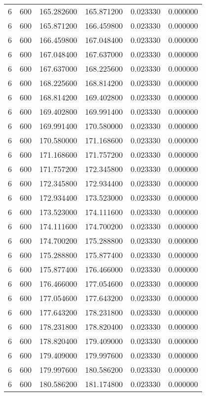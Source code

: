 \begin{longtable}{rrrrrr}
6 & 600 & 165.282600 & 165.871200 & 0.023330 & 0.000000 \\
6 & 600 & 165.871200 & 166.459800 & 0.023330 & 0.000000 \\
6 & 600 & 166.459800 & 167.048400 & 0.023330 & 0.000000 \\
6 & 600 & 167.048400 & 167.637000 & 0.023330 & 0.000000 \\
6 & 600 & 167.637000 & 168.225600 & 0.023330 & 0.000000 \\
6 & 600 & 168.225600 & 168.814200 & 0.023330 & 0.000000 \\
6 & 600 & 168.814200 & 169.402800 & 0.023330 & 0.000000 \\
6 & 600 & 169.402800 & 169.991400 & 0.023330 & 0.000000 \\
6 & 600 & 169.991400 & 170.580000 & 0.023330 & 0.000000 \\
6 & 600 & 170.580000 & 171.168600 & 0.023330 & 0.000000 \\
6 & 600 & 171.168600 & 171.757200 & 0.023330 & 0.000000 \\
6 & 600 & 171.757200 & 172.345800 & 0.023330 & 0.000000 \\
6 & 600 & 172.345800 & 172.934400 & 0.023330 & 0.000000 \\
6 & 600 & 172.934400 & 173.523000 & 0.023330 & 0.000000 \\
6 & 600 & 173.523000 & 174.111600 & 0.023330 & 0.000000 \\
6 & 600 & 174.111600 & 174.700200 & 0.023330 & 0.000000 \\
6 & 600 & 174.700200 & 175.288800 & 0.023330 & 0.000000 \\
6 & 600 & 175.288800 & 175.877400 & 0.023330 & 0.000000 \\
6 & 600 & 175.877400 & 176.466000 & 0.023330 & 0.000000 \\
6 & 600 & 176.466000 & 177.054600 & 0.023330 & 0.000000 \\
6 & 600 & 177.054600 & 177.643200 & 0.023330 & 0.000000 \\
6 & 600 & 177.643200 & 178.231800 & 0.023330 & 0.000000 \\
6 & 600 & 178.231800 & 178.820400 & 0.023330 & 0.000000 \\
6 & 600 & 178.820400 & 179.409000 & 0.023330 & 0.000000 \\
6 & 600 & 179.409000 & 179.997600 & 0.023330 & 0.000000 \\
6 & 600 & 179.997600 & 180.586200 & 0.023330 & 0.000000 \\
6 & 600 & 180.586200 & 181.174800 & 0.023330 & 0.000000 \\

\end{longtable}
